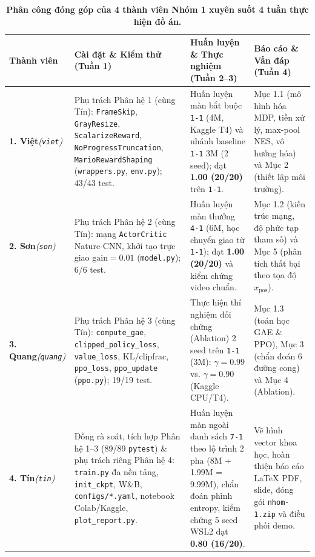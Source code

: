 \documentclass[a4paper,10pt]{article}
\begin{document}
\begin{table}[!htbp]
  \centering
  \caption{\textbf{Phân công đóng góp của 4 thành viên Nhóm 1 xuyên suốt 4 tuần thực hiện đồ án.}}
  \label{tab:team}
  \footnotesize
  \begin{tabular}{@{}>{\raggedright\arraybackslash}p{1.75cm}>{\raggedright\arraybackslash}p{5.0cm}>{\raggedright\arraybackslash}p{4.95cm}>{\raggedright\arraybackslash}p{4.5cm}@{}}
    \toprule
    \textbf{Thành viên} & \textbf{Cài đặt \& Kiểm thử (Tuần 1)} & \textbf{Huấn luyện \& Thực nghiệm (Tuần 2--3)} & \textbf{Báo cáo \& Vấn đáp (Tuần 4)} \\
    \midrule
    \textbf{1. Việt}\newline\emph{(\texttt{viet})} & Phụ trách Phân hệ 1 (cùng Tín): \texttt{FrameSkip}, \texttt{GrayResize}, \texttt{ScalarizeReward}, \texttt{NoProgressTruncation}, \texttt{MarioRewardShaping} (\texttt{wrappers.py}, \texttt{env.py}); 43/43 test. & Huấn luyện màn bắt buộc \texttt{1-1} (4M, Kaggle T4) và nhánh baseline \texttt{1-1} 3M (2 seed); đạt \textbf{1.00 (20/20)} trên \texttt{1-1}. & Mục 1.1 (mô hình hóa MDP, tiền xử lý, max-pool NES, vô hướng hóa) và Mục 2 (thiết lập môi trường). \\
    \addlinespace[3pt]
    \textbf{2. Sơn}\newline\emph{(\texttt{son})} & Phụ trách Phân hệ 2 (cùng Tín): mạng \texttt{ActorCritic} Nature-CNN, khởi tạo trực giao $\text{gain}=0.01$ (\texttt{model.py}); 6/6 test. & Huấn luyện màn thưởng \texttt{4-1} (6M, học chuyển giao từ \texttt{1-1}); đạt \textbf{1.00 (20/20)} và kiểm chứng video chuẩn. & Mục 1.2 (kiến trúc mạng, độ phức tạp tham số) và Mục 5 (phân tích thất bại theo tọa độ $x_{\text{pos}}$). \\
    \addlinespace[3pt]
    \textbf{3. Quang}\newline\emph{(\texttt{quang})} & Phụ trách Phân hệ 3 (cùng Tín): \texttt{compute\_gae}, \texttt{clipped\_policy\_loss}, \texttt{value\_loss}, KL/clipfrac, \texttt{ppo\_loss}, \texttt{ppo\_update} (\texttt{ppo.py}); 19/19 test. & Thực hiện thí nghiệm đối chứng (Ablation) 2 seed trên \texttt{1-1} (3M): $\gamma=0.99$ vs. $\gamma=0.90$ (Kaggle CPU/T4). & Mục 1.3 (toán học GAE \& PPO), Mục 3 (chẩn đoán 6 đường cong) và Mục 4 (Ablation). \\
    \addlinespace[3pt]
    \textbf{4. Tín}\newline\emph{(\texttt{tin})} & Đồng rà soát, tích hợp Phân hệ 1--3 (89/89 \texttt{pytest}) \& phụ trách riêng Phân hệ 4: \texttt{train.py} đa nền tảng, \texttt{init\_ckpt}, W\&B, \texttt{configs/*.yaml}, notebook Colab/Kaggle, \texttt{plot\_report.py}. & Huấn luyện màn ngoài danh sách \texttt{7-1} theo lộ trình 2 pha (8M + 1.99M = 9.99M), chẩn đoán phình entropy, kiểm chứng 5 seed WSL2 đạt \textbf{0.80 (16/20)}. & Vẽ hình vector khoa học, hoàn thiện báo cáo LaTeX PDF, slide, đóng gói \texttt{nhom-1.zip} và điều phối demo. \\
    \bottomrule
  \end{tabular}
\end{table}
\end{document}
